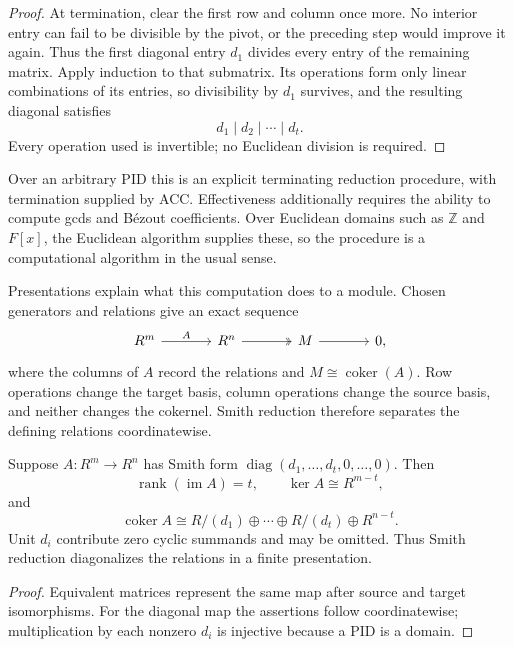 \begin{proof}
At termination, clear the first row and column once more.  No interior entry
can fail to be divisible by the pivot, or the preceding step would improve it
again.  Thus the first diagonal entry \(d_1\) divides every entry of the
remaining matrix.  Apply induction to that submatrix.  Its operations form
only linear combinations of its entries, so divisibility by \(d_1\) survives,
and the resulting diagonal satisfies
\[
d_1\mid d_2\mid\cdots\mid d_t.
\]
Every operation used is invertible; no Euclidean division is required.
\end{proof}

Over an arbitrary PID this is an explicit terminating reduction procedure,
with termination supplied by ACC. Effectiveness additionally requires the
ability to compute gcds and B\'ezout coefficients. Over Euclidean domains such
as \(\mathbb Z\) and \(F[x]\), the Euclidean algorithm supplies these, so the
procedure is a computational algorithm in the usual sense.

Presentations explain what this computation does to a module.  Chosen
generators and relations give an exact sequence
\[
\begin{tikzcd}[column sep=large]
R^m\arrow[r,"A"]&R^n\arrow[r,two heads]&M\arrow[r]&0,
\end{tikzcd}
\]
where the columns of \(A\) record the relations and
\(M\cong\operatorname{coker}(A)\).  Row operations change the target basis,
column operations change the source basis, and neither changes the cokernel.
Smith reduction therefore separates the defining relations coordinatewise.

\begin{corollary}
\label{cor:smith-kernel-cokernel}
Suppose \(A:R^m\to R^n\) has Smith form
\(\operatorname{diag}(d_1,\ldots,d_t,0,\ldots,0)\). Then
\[
\operatorname{rank}(\operatorname{im}A)=t,
\qquad \ker A\cong R^{m-t},
\]
and
\[
\operatorname{coker}A\cong
R/(d_1)\oplus\cdots\oplus R/(d_t)\oplus R^{n-t}.
\]
Unit \(d_i\) contribute zero cyclic summands and may be omitted. Thus Smith
reduction diagonalizes the relations in a finite presentation.
\end{corollary}
\begin{proof}
Equivalent matrices represent the same map after source and target
isomorphisms. For the diagonal map the assertions follow coordinatewise;
multiplication by each nonzero \(d_i\) is injective because a PID is a domain.
\end{proof}

